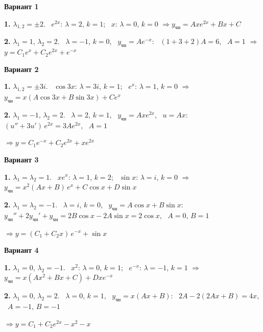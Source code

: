 \documentclass[11pt,a4paper]{article}
\newcommand{\ych}{y_{\text{чн}}}
\begin{document}
\par\medskip\textbf{Вариант 1}\par

\textbf{1.} $\lambda_{1,2} = \pm 2$. \ $e^{2x}$: $\lambda = 2$, $k = 1$; \ $x$: $\lambda = 0$, $k = 0$ \quad$\Rightarrow$\quad $\ych = Ax e^{2x} + Bx + C$

\textbf{2.} $\lambda_1 = 1$, $\lambda_2 = 2$. \ $\lambda = -1$, $k = 0$, \ $\ych = Ae^{-x}$: \ $(1 + 3 + 2)A = 6$, \ $A = 1$ \quad$\Rightarrow$\quad $y = C_1 e^{x} + C_2 e^{2x} + e^{-x}$

\par\medskip\textbf{Вариант 2}\par

\textbf{1.} $\lambda_{1,2} = \pm 3i$. \ $\cos 3x$: $\lambda = 3i$, $k = 1$; \ $e^{x}$: $\lambda = 1$, $k = 0$ \quad$\Rightarrow$\quad $\ych = x(A\cos 3x + B\sin 3x) + Ce^{x}$

\textbf{2.} $\lambda_1 = -1$, $\lambda_2 = 2$. \ $\lambda = 2$, $k = 1$, \ $\ych = Axe^{2x}$, \ $u = Ax$: \ $(u'' + 3u')\,e^{2x} = 3Ae^{2x}$, \ $A = 1$

\quad$\Rightarrow$\quad $y = C_1 e^{-x} + C_2 e^{2x} + x e^{2x}$

\par\medskip\textbf{Вариант 3}\par

\textbf{1.} $\lambda_1 = \lambda_2 = 1$. \ $xe^{x}$: $\lambda = 1$, $k = 2$; \ $\sin x$: $\lambda = i$, $k = 0$ \quad$\Rightarrow$\quad $\ych = x^2(Ax + B)\, e^{x} + C\cos x + D\sin x$

\textbf{2.} $\lambda_1 = \lambda_2 = -1$. \ $\lambda = i$, $k = 0$, \ $\ych = A\cos x + B\sin x$:
\ $\ych'' + 2\ych' + \ych = 2B\cos x - 2A\sin x = 2\cos x$, \ $A = 0$, $B = 1$

\quad$\Rightarrow$\quad $y = (C_1 + C_2 x)\, e^{-x} + \sin x$

\par\medskip\textbf{Вариант 4}\par

\textbf{1.} $\lambda_1 = 0$, $\lambda_2 = -1$. \ $x^2$: $\lambda = 0$, $k = 1$; \ $e^{-x}$: $\lambda = -1$, $k = 1$ \quad$\Rightarrow$\quad $\ych = x(Ax^2 + Bx + C) + Dxe^{-x}$

\textbf{2.} $\lambda_1 = 0$, $\lambda_2 = 2$. \ $\lambda = 0$, $k = 1$, \ $\ych = x(Ax + B)$: \ $2A - 2(2Ax + B) = 4x$, \ $A = -1$, $B = -1$

\quad$\Rightarrow$\quad $y = C_1 + C_2 e^{2x} - x^2 - x$
\end{document}
